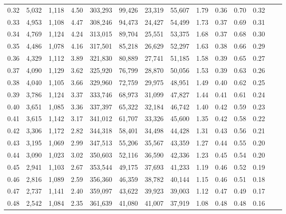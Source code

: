 \begin{tabular}{rrrrrrrrrrrrrr}
0.32 &   5,032 &  1,118 &    4.50 &  303,293 &   99,426 &  23,319 &  55,607 &  1.79 &  0.36 &  0.70 &      0.32 \\
0.33 &   4,953 &  1,108 &    4.47 &  308,246 &   94,473 &  24,427 &  54,499 &  1.73 &  0.37 &  0.69 &      0.31 \\
0.34 &   4,769 &  1,124 &    4.24 &  313,015 &   89,704 &  25,551 &  53,375 &  1.68 &  0.37 &  0.68 &      0.30 \\
0.35 &   4,486 &  1,078 &    4.16 &  317,501 &   85,218 &  26,629 &  52,297 &  1.63 &  0.38 &  0.66 &      0.29 \\
0.36 &   4,329 &  1,112 &    3.89 &  321,830 &   80,889 &  27,741 &  51,185 &  1.58 &  0.39 &  0.65 &      0.27 \\
0.37 &   4,090 &  1,129 &    3.62 &  325,920 &   76,799 &  28,870 &  50,056 &  1.53 &  0.39 &  0.63 &      0.26 \\
0.38 &   4,040 &  1,105 &    3.66 &  329,960 &   72,759 &  29,975 &  48,951 &  1.49 &  0.40 &  0.62 &      0.25 \\
0.39 &   3,786 &  1,124 &    3.37 &  333,746 &   68,973 &  31,099 &  47,827 &  1.44 &  0.41 &  0.61 &      0.24 \\
0.40 &   3,651 &  1,085 &    3.36 &  337,397 &   65,322 &  32,184 &  46,742 &  1.40 &  0.42 &  0.59 &      0.23 \\
0.41 &   3,615 &  1,142 &    3.17 &  341,012 &   61,707 &  33,326 &  45,600 &  1.35 &  0.42 &  0.58 &      0.22 \\
0.42 &   3,306 &  1,172 &    2.82 &  344,318 &   58,401 &  34,498 &  44,428 &  1.31 &  0.43 &  0.56 &      0.21 \\
0.43 &   3,195 &  1,069 &    2.99 &  347,513 &   55,206 &  35,567 &  43,359 &  1.27 &  0.44 &  0.55 &      0.20 \\
0.44 &   3,090 &  1,023 &    3.02 &  350,603 &   52,116 &  36,590 &  42,336 &  1.23 &  0.45 &  0.54 &      0.20 \\
0.45 &   2,941 &  1,103 &    2.67 &  353,544 &   49,175 &  37,693 &  41,233 &  1.19 &  0.46 &  0.52 &      0.19 \\
0.46 &   2,816 &  1,089 &    2.59 &  356,360 &   46,359 &  38,782 &  40,144 &  1.15 &  0.46 &  0.51 &      0.18 \\
0.47 &   2,737 &  1,141 &    2.40 &  359,097 &   43,622 &  39,923 &  39,003 &  1.12 &  0.47 &  0.49 &      0.17 \\
0.48 &   2,542 &  1,084 &    2.35 &  361,639 &   41,080 &  41,007 &  37,919 &  1.08 &  0.48 &  0.48 &      0.16 \\

\end{tabular}
